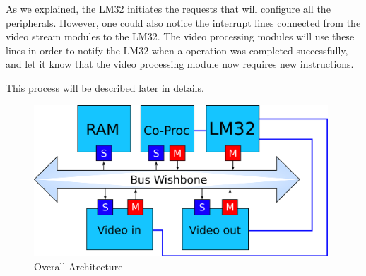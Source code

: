 As we explained, the LM32 initiates the requests that will configure all the peripherals. However, one could also notice the interrupt lines connected from the video stream modules to the LM32. The video processing modules will use these lines in order to notify the LM32 when a operation was completed successfully, and let it know that the video processing module now requires new instructions.

This process will be described later in details.

\begin{figure}[h]
	\center
	\includegraphics[width=11cm]{figs/overall_arch.pdf}

	\caption{Overall Architecture}
	\label{archi}
\end{figure}
